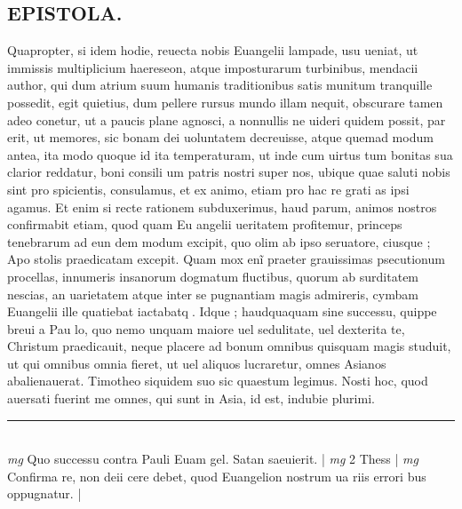 \documentclass{article}
\begin{document}
\begin{pages}
\section*{EPISTOLA.  }\pstart Quapropter, si idem hodie, reuecta nobis Euangelii lampade, usu ueniat, ut immissis multiplicium haereseon, atque  imposturarum turbinibus, mendacii author, qui dum atrium suum humanis traditionibus satis munitum tranquille possedit, egit quietius, dum pellere rursus mundo illam nequit, obscurare tamen adeo conetur, ut a paucis plane agnosci, a nonnullis ne uideri quidem possit, par erit, ut memores, sic bonam dei uoluntatem decreuisse, atque  quemad modum antea, ita modo quoque  id ita temperaturam, ut inde cum uirtus tum bonitas sua clarior reddatur, boni consili um patris nostri super nos, ubique  quae saluti nobis sint pro spicientis, consulamus, et ex animo, etiam pro hac re grati as ipsi agamus. Et enim si recte rationem subduxerimus, haud parum, animos nostros confirmabit etiam, quod quam Eu angelii ueritatem profitemur, princeps tenebrarum ad eun dem modum excipit, quo olim ab ipso seruatore, ciusque ; Apo stolis praedicatam excepit.   \pend\pstart Quam mox enĩ praeter grauissimas psecutionum procellas, innumeris insanorum dogmatum fluctibus, quorum ab surditatem nescias, an uarietatem atque  inter se pugnantiam magis admireris, cymbam Euangelii ille quatiebat iactabatq. Idque ; haudquaquam sine successu, quippe breui a Pau lo, quo nemo unquam maiore uel sedulitate, uel dexterita te, Christum praedicauit, neque  placere ad bonum omnibus quisquam magis studuit, ut qui omnibus   omnia fieret, ut uel aliquos lucraretur, omnes Asianos abalienauerat.  Timotheo siquidem suo sic quaestum legimus.  Nosti hoc, quod auersati fuerint me omnes, qui sunt in Asia, id est, indubie plurimi.   \pend
\vspace{0.5cm}\noindent
\vspace{0.2cm}\rule{1cm}{0.2pt}\\ 
\hspace{0.2cm}\textit{mg}
\footnotesize Quo successu contra Pauli Euam gel.  Satan saeuierit.  
\normalsize| 
\hspace{0.2cm}\textit{mg}
\footnotesize 2 Thess 
\normalsize| 
\hspace{0.2cm}\textit{mg}
\footnotesize Confirma re, non deii cere debet, quod Euangelion nostrum ua riis errori bus oppugnatur.  
\normalsize| 

\end{pages}
\end{document}
